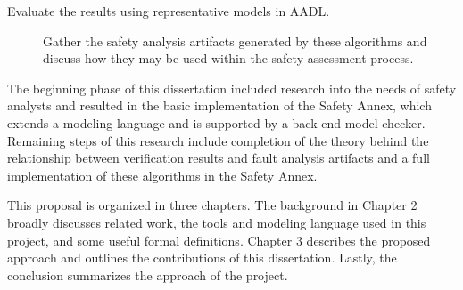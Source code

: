 \begin{description}
\item[Evaluate the results using representative models in AADL.] Gather the safety analysis artifacts generated by these algorithms and discuss how they may be used within the safety assessment process.
\end{description}

The beginning phase of this dissertation included research into the needs of safety analysts and resulted in the basic implementation of the Safety Annex, which extends a modeling language and is supported by a back-end model checker. Remaining steps of this research include completion of the theory behind the relationship between verification results and fault analysis artifacts and a full implementation of these algorithms in the Safety Annex. 

This proposal is organized in three chapters. The background in Chapter 2 broadly discusses related work, the tools and modeling language used in this project, and some useful formal definitions. Chapter 3 describes the proposed approach and outlines the contributions of this dissertation. Lastly, the conclusion summarizes the approach of the project.



